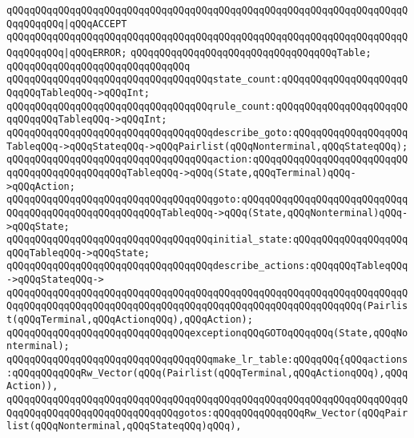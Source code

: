 \verb|qQQqqQQqqQQqqQQqqQQqqQQqqQQqqQQqqQQqqQQqqQQqqQQqqQQqqQQqqQQqqQQqqQQqqQQqqQQqqQQq|\verb#|qQQqACCEPT#\newline
\verb|qQQqqQQqqQQqqQQqqQQqqQQqqQQqqQQqqQQqqQQqqQQqqQQqqQQqqQQqqQQqqQQqqQQqqQQqqQQqqQQq|\verb#|qQQqERROR;#\newline
\newline
\verb|qQQqqQQqqQQqqQQqqQQqqQQqqQQqqQQqqQQqTable;|\newline
\verb|qQQqqQQqqQQqqQQqqQQqqQQqqQQqqQQq|\newline
\verb|qQQqqQQqqQQqqQQqqQQqqQQqqQQqqQQqqQQqstate_count:qQQqqQQqqQQqqQQqqQQqqQQqqQQqTableqQQq->qQQqInt;|\newline
\verb|qQQqqQQqqQQqqQQqqQQqqQQqqQQqqQQqqQQqrule_count:qQQqqQQqqQQqqQQqqQQqqQQqqQQqqQQqTableqQQq->qQQqInt;|\newline
\verb|qQQqqQQqqQQqqQQqqQQqqQQqqQQqqQQqqQQqdescribe_goto:qQQqqQQqqQQqqQQqqQQqTableqQQq->qQQqStateqQQq->qQQqPairlist(qQQqNonterminal,qQQqStateqQQq);|\newline
\verb|qQQqqQQqqQQqqQQqqQQqqQQqqQQqqQQqqQQqaction:qQQqqQQqqQQqqQQqqQQqqQQqqQQqqQQqqQQqqQQqqQQqqQQqTableqQQq->qQQq(State,qQQqTerminal)qQQq->qQQqAction;|\newline
\verb|qQQqqQQqqQQqqQQqqQQqqQQqqQQqqQQqqQQqgoto:qQQqqQQqqQQqqQQqqQQqqQQqqQQqqQQqqQQqqQQqqQQqqQQqqQQqqQQqTableqQQq->qQQq(State,qQQqNonterminal)qQQq->qQQqState;|\newline
\verb|qQQqqQQqqQQqqQQqqQQqqQQqqQQqqQQqqQQqinitial_state:qQQqqQQqqQQqqQQqqQQqqQQqTableqQQq->qQQqState;|\newline
\verb|qQQqqQQqqQQqqQQqqQQqqQQqqQQqqQQqqQQqdescribe_actions:qQQqqQQqTableqQQq->qQQqStateqQQq->|\newline
\verb|qQQqqQQqqQQqqQQqqQQqqQQqqQQqqQQqqQQqqQQqqQQqqQQqqQQqqQQqqQQqqQQqqQQqqQQqqQQqqQQqqQQqqQQqqQQqqQQqqQQqqQQqqQQqqQQqqQQqqQQqqQQqqQQqqQQq(Pairlist(qQQqTerminal,qQQqActionqQQq),qQQqAction);|\newline
\newline
\verb|qQQqqQQqqQQqqQQqqQQqqQQqqQQqqQQqexceptionqQQqGOTOqQQqqQQq(State,qQQqNonterminal);|\newline
\newline
\verb|qQQqqQQqqQQqqQQqqQQqqQQqqQQqqQQqqQQqmake_lr_table:qQQqqQQq{qQQqactions:qQQqqQQqqQQqRw_Vector(qQQq(Pairlist(qQQqTerminal,qQQqActionqQQq),qQQqAction)),|\newline
\verb|qQQqqQQqqQQqqQQqqQQqqQQqqQQqqQQqqQQqqQQqqQQqqQQqqQQqqQQqqQQqqQQqqQQqqQQqqQQqqQQqqQQqqQQqqQQqqQQqqQQqgotos:qQQqqQQqqQQqqQQqRw_Vector(qQQqPairlist(qQQqNonterminal,qQQqStateqQQq)qQQq),|\newline

